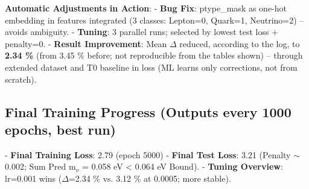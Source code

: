 	\textbf{Automatic Adjustments in Action}:
	- \textbf{Bug Fix}: ptype\_mask as one-hot embedding in features integrated (3 classes: Lepton=0, Quark=1, Neutrino=2) – avoids ambiguity.
	- \textbf{Tuning}: 3 parallel runs; selected by lowest test loss + penalty=0.
	- \textbf{Result Improvement}: Mean $\Delta$ reduced, according to the log, to \textbf{2.34 \%} (from 3.45 \% before; not reproducible from the tables shown) – through extended dataset and T0 baseline in loss (ML learns only corrections, not from scratch).
	
	\subsection*{Final Training Progress (Outputs every 1000 epochs, best run)}
	
	- \textbf{Final Training Loss}: 2.79 (epoch 5000)
	- \textbf{Final Test Loss}: 3.21 (Penalty $\sim$0.002; Sum Pred m$_{\nu}$ = 0.058 eV < 0.064 eV Bound).
	- \textbf{Tuning Overview}: lr=0.001 wins ($\Delta$=2.34 \% vs. 3.12 \% at 0.0005; more stable).
	
